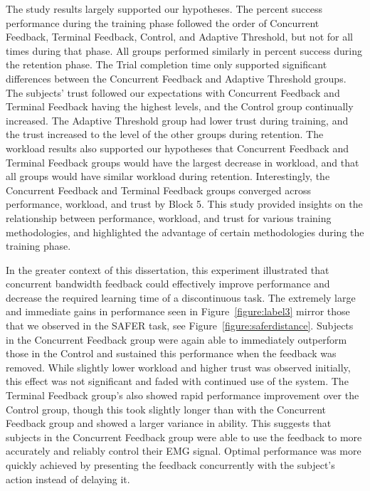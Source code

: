 The study results largely supported our hypotheses.
The percent success performance during the training phase followed the order of Concurrent Feedback, Terminal Feedback, Control, and Adaptive Threshold, but not for all times during that phase.
All groups performed similarly in percent success during the retention phase.
The Trial completion time only supported significant differences between the Concurrent Feedback and Adaptive Threshold groups.
The subjects' trust followed our expectations with Concurrent Feedback and Terminal Feedback having the highest levels, and the Control group continually increased.
The Adaptive Threshold group had lower trust during training, and the trust increased to the level of the other groups during retention.
The workload results also supported our hypotheses that Concurrent Feedback and Terminal Feedback groups would have the largest decrease in workload, and that all groups would have similar workload during retention.
Interestingly, the Concurrent Feedback and Terminal Feedback groups converged across performance, workload, and trust by Block 5.
This study provided insights on the relationship between performance, workload, and trust for various training methodologies, and highlighted the advantage of certain methodologies during the training phase.


In the greater context of this dissertation, this experiment illustrated that concurrent bandwidth feedback could effectively improve performance and decrease the required learning time of a discontinuous task.
The extremely large and immediate gains in performance seen in Figure~\ref{figure:label3} mirror those that we observed in the SAFER task, see Figure~\ref{figure:saferdistance}.
Subjects in the Concurrent Feedback group were again able to immediately outperform those in the Control and sustained this performance when the feedback was removed.
While slightly lower workload and higher trust was observed initially, this effect was not significant and faded with continued use of the system.
The Terminal Feedback group's also showed rapid performance improvement over the Control group, though this took slightly longer than with the Concurrent Feedback group and showed a larger variance in ability.
This suggests that subjects in the Concurrent Feedback group were able to use the feedback to more accurately and reliably control their EMG signal.
Optimal performance was more quickly achieved by presenting the feedback concurrently with the subject's action instead of delaying it.
